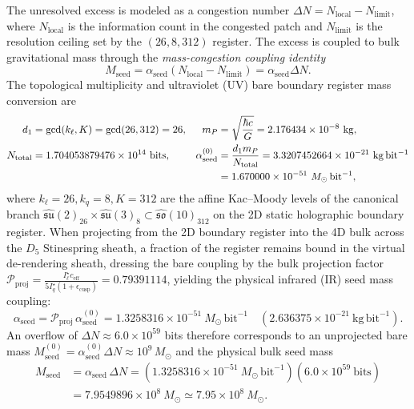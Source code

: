 \documentclass[11pt,letterpaper]{article}
\theoremstyle{plain}
\newcommand{\msun}{M_{\odot}}
\begin{document}
The unresolved excess is modeled as a congestion number
$\Delta N = N_{\text{local}}-N_{\text{limit}}$, where $N_{\text{local}}$ is the
information count in the congested patch and $N_{\text{limit}}$ is the
resolution ceiling set by the $(26,8,312)$ register.  The excess is coupled
to bulk gravitational mass through the \emph{mass-congestion coupling identity}
\begin{equation}
\label{eq:mass-congestion-identity}
 M_{\text{seed}}
 =
 \alpha_{\text{seed}}\left(N_{\text{local}}-N_{\text{limit}}\right)
 =
 \alpha_{\text{seed}}\Delta N.
\end{equation}
The topological multiplicity and ultraviolet (UV) bare boundary register mass conversion are
\begin{align}
\label{eq:mass-congestion-coupling}
 d_1
 &=\gcd(k_\ell,K)=\gcd(26,312)=26,
 &
 m_P&=\sqrt{\frac{\hbar c}{G}}
 =2.176434\times10^{-8}\ \mathrm{kg},
 \\
 N_{\mathrm{total}}
 &=1.704053879476\times10^{14}\ \mathrm{bits},
 &
 \alpha_{\text{seed}}^{(0)}
 &=\frac{d_1m_P}{N_{\mathrm{total}}}
 =3.3207452664\times10^{-21}\ \mathrm{kg\,bit^{-1}}
 \notag\\
 &&&=1.670000\times10^{-51}\ \msun\,\mathrm{bit^{-1}},
\end{align}
where $k_\ell = 26, k_q = 8, K = 312$ are the affine Kac--Moody levels of the canonical branch $\widehat{\mathfrak{su}}(2)_{26} \times \widehat{\mathfrak{su}}(3)_8 \subset \widehat{\mathfrak{so}}(10)_{312}$ on the 2D static holographic boundary register.  When projecting from the 2D boundary register into the 4D bulk across the $D_5$ Stinespring sheath, a fraction of the register remains bound in the virtual de-rendering sheath, dressing the bare coupling by the bulk projection factor $\mathcal{P}_{\text{proj}} = \frac{I_\ell^\star c_{\text{eff}}}{5 I_q^\star(1 + \epsilon_{\text{cusp}})} = 0.79391114$, yielding the physical infrared (IR) seed mass coupling:
\begin{equation}
\label{eq:physical-seed-coupling}
\alpha_{\text{seed}} = \mathcal{P}_{\text{proj}}\,\alpha_{\text{seed}}^{(0)} = 1.3258316\times10^{-51}\ \msun\,\mathrm{bit}^{-1} \quad \left(2.636375\times10^{-21}\ \mathrm{kg\,bit}^{-1}\right).
\end{equation}
An overflow of $\Delta N\approx 6.0\times10^{59}$ bits therefore corresponds to an unprojected bare mass $M_{\text{seed}}^{(0)} = \alpha_{\text{seed}}^{(0)}\Delta N \approx 10^9\,\msun$ and the physical bulk seed mass
\begin{equation}
\label{eq:mass-congestion-billion-solar-mass}
\begin{aligned}
 M_{\text{seed}}
 &=
 \alpha_{\text{seed}}\,\Delta N
 =
 \left(1.3258316\times10^{-51}\ \msun\,\mathrm{bit}^{-1}\right)
 \left(6.0\times10^{59}\ \mathrm{bits}\right) \\
 &= 7.9549896\times 10^8\ \msun \simeq 7.95\times10^{8}\ \msun.
\end{aligned}
\end{equation}
\end{document}
